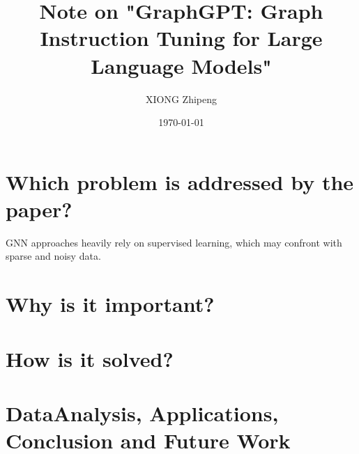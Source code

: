 \documentclass{article}
\title{Note on "GraphGPT: Graph Instruction Tuning for Large Language Models"}
\author{XIONG Zhipeng}
\date{\today}
\begin{document}
\maketitle

\section{Which problem is addressed by the paper?}

GNN approaches heavily rely on supervised learning, which may confront 
with sparse and noisy data.


\section{Why is it important?}



\section{How is it solved?}

\section{DataAnalysis, Applications, Conclusion and Future Work}
\end{document}
